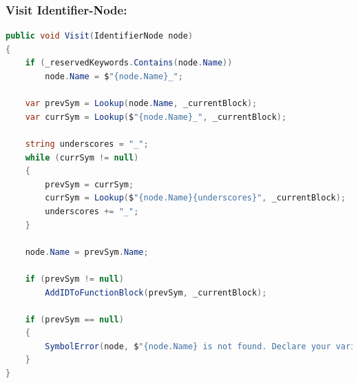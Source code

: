 \subsubsection{Visit Identifier-Node:}
\begin{lstlisting}[language = csharp, firstnumber=767, label={list:symbolTable_IdentifierNode}, caption=Visit Identifier-Node - 767-792 - CobraCompiler/SymbolTable.cs]
public void Visit(IdentifierNode node)
{
    if (_reservedKeywords.Contains(node.Name))
        node.Name = $"{node.Name}_";

    var prevSym = Lookup(node.Name, _currentBlock);
    var currSym = Lookup($"{node.Name}_", _currentBlock);

    string underscores = "_";
    while (currSym != null)
    {
        prevSym = currSym;
        currSym = Lookup($"{node.Name}{underscores}", _currentBlock);
        underscores += "_";
    }

    node.Name = prevSym.Name;

    if (prevSym != null)
        AddIDToFunctionBlock(prevSym, _currentBlock);

    if (prevSym == null)
    {
        SymbolError(node, $"{node.Name} is not found. Declare your variable before use.");
    }
}
\end{lstlisting}